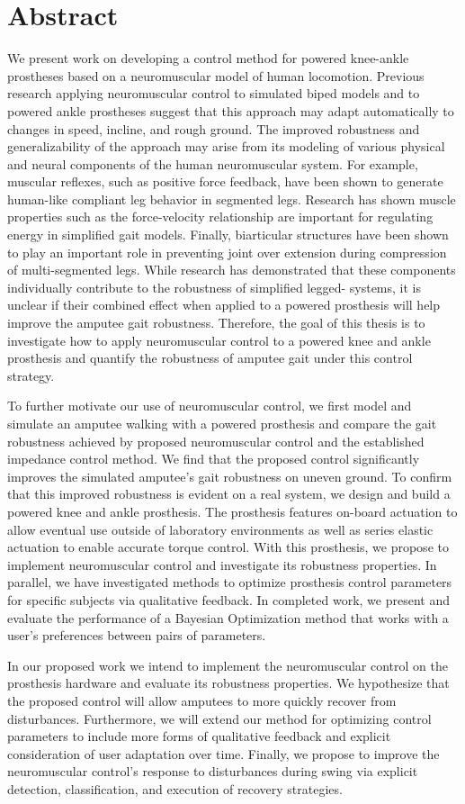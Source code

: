 \chapter*{Abstract}

We present work on developing a control method for powered knee-ankle prostheses
based on a neuromuscular model of human locomotion. Previous research applying
neuromuscular control to simulated biped models and to powered ankle prostheses
suggest that this approach may adapt automatically to changes in speed, incline,
and rough ground. The improved robustness and generalizability of the approach
may arise from its modeling of various physical and neural components of the
human neuromuscular system. For example, muscular reflexes, such as positive
force feedback, have been shown to generate human-like compliant leg behavior in
segmented legs. Research has shown muscle properties such as the force-velocity
relationship are important for regulating energy in simplified gait models.
Finally, biarticular structures have been shown to play an important role in
preventing joint over extension during compression of multi-segmented legs.
While research has demonstrated that these components individually contribute to
the robustness of simplified legged- systems, it is unclear if their combined
effect when applied to a powered prosthesis will help improve the amputee gait
robustness. Therefore, the goal of this thesis is to investigate how to apply
neuromuscular control to a powered knee and ankle prosthesis and quantify the
robustness of amputee gait under this control strategy.

To further motivate our use of neuromuscular control, we first model and
simulate an amputee walking with a powered prosthesis and compare the gait
robustness achieved by proposed neuromuscular control and the established
impedance control method. We find that the proposed control significantly
improves the simulated amputee's gait robustness on uneven ground. To confirm
that this improved robustness is evident on a real system, we design and build a
powered knee and ankle prosthesis. The prosthesis features on-board actuation to
allow eventual use outside of laboratory environments as well as series elastic
actuation to enable accurate torque control. With this prosthesis, we propose to
implement neuromuscular control and investigate its robustness properties. In
parallel, we have investigated methods to optimize prosthesis control parameters
for specific subjects via qualitative feedback. In completed work, we present 
and evaluate the performance of a Bayesian Optimization method that works with
a user's preferences between pairs of parameters.

In our proposed work we intend to implement the neuromuscular control on the
prosthesis hardware and evaluate its robustness properties. We hypothesize that
the proposed control will allow amputees to more quickly recover from
disturbances. Furthermore, we will extend our method for optimizing control
parameters to include more forms of qualitative feedback and explicit
consideration of user adaptation over time. Finally, we propose to improve the
neuromuscular control's response to disturbances during swing via explicit
detection, classification, and execution of recovery strategies.
